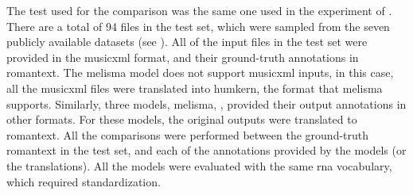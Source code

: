 
The test used for the comparison was the same one used in
the experiment of .
There are a total of 94 files in the test set, which were
sampled from the seven publicly available datasets (see
). All of the input files
in the test set were provided in the \gls{musicxml} format,
and their ground-truth annotations in \gls{romantext}. The
\gls{melisma} model does not support \gls{musicxml} inputs,
in this case, all the \gls{musicxml} files were translated
into \gls{humkern}, the format that \gls{melisma} supports.
Similarly, three models, \gls{melisma},
\textcite{chen2021attend, mcleod2021modular}, provided their
output annotations in other formats. For these models, the
original outputs were translated to \gls{romantext}. All the
comparisons were performed between the ground-truth
\gls{romantext} in the test set, and each of the annotations
provided by the models (or the translations). All the models
were evaluated with the same \gls{rna} vocabulary, which
required standardization.
